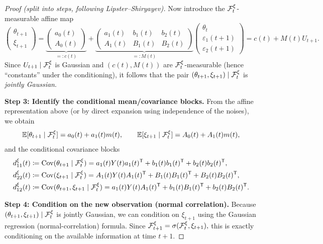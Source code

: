 \begin{proof}[Proof (split into steps, following Lipster--Shiryayev)]
Now introduce the $\mathcal{F}_t^\xi$-measurable affine map
\[
\begin{pmatrix}
\theta_{t+1}\\ \xi_{t+1}
\end{pmatrix}
=
\underbrace{\begin{pmatrix} a_0(t)\\ A_0(t)\end{pmatrix}}_{=:c(t)}
+
\underbrace{\begin{pmatrix}
a_1(t) & b_1(t) & b_2(t)\\
A_1(t) & B_1(t) & B_2(t)
\end{pmatrix}}_{=:M(t)}
\begin{pmatrix}
\theta_t\\ \varepsilon_1(t+1)\\ \varepsilon_2(t+1)
\end{pmatrix}
=
c(t)+M(t)U_{t+1}.
\]
Since $U_{t+1}\mid \mathcal{F}_t^\xi$ is Gaussian and $(c(t),M(t))$ are $\mathcal{F}_t^\xi$-measurable (hence ``constants'' under the conditioning),
it follows that the pair $(\theta_{t+1},\xi_{t+1})\mid \mathcal{F}_t^\xi$ is \emph{jointly Gaussian}.

\medskip
\noindent\textbf{Step 3: Identify the conditional mean/covariance blocks.}
From the affine representation above (or by direct expansion using independence of the noises), we obtain
\[
\mathbb{E}[\theta_{t+1}\mid \mathcal{F}_t^\xi]=a_0(t)+a_1(t)m(t),\qquad
\mathbb{E}[\xi_{t+1}\mid \mathcal{F}_t^\xi]=A_0(t)+A_1(t)m(t),
\]
and the conditional covariance blocks
\begin{align*}
d_{11}^\xi(t)&\coloneqq \mathrm{Cov}(\theta_{t+1}\mid \mathcal{F}_t^\xi)
= a_1(t)Y(t)a_1(t)^{\mathsf{T}} + b_1(t)b_1(t)^{\mathsf{T}} + b_2(t)b_2(t)^{\mathsf{T}},\\
d_{22}^\xi(t)&\coloneqq \mathrm{Cov}(\xi_{t+1}\mid \mathcal{F}_t^\xi)
= A_1(t)Y(t)A_1(t)^{\mathsf{T}} + B_1(t)B_1(t)^{\mathsf{T}} + B_2(t)B_2(t)^{\mathsf{T}},\\
d_{12}^\xi(t)&\coloneqq \mathrm{Cov}(\theta_{t+1},\xi_{t+1}\mid \mathcal{F}_t^\xi)
= a_1(t)Y(t)A_1(t)^{\mathsf{T}} + b_1(t)B_1(t)^{\mathsf{T}} + b_2(t)B_2(t)^{\mathsf{T}}.
\end{align*}

\medskip
\noindent\textbf{Step 4: Condition on the new observation (normal correlation).}
Because $(\theta_{t+1},\xi_{t+1})\mid \mathcal{F}_t^\xi$ is jointly Gaussian, we can condition on $\xi_{t+1}$ using the
Gaussian regression (normal-correlation) formula. Since
\(
\mathcal{F}_{t+1}^\xi=\sigma(\mathcal{F}_t^\xi,\xi_{t+1}),
\)
this is exactly conditioning on the available information at time $t+1$.


\end{proof}
